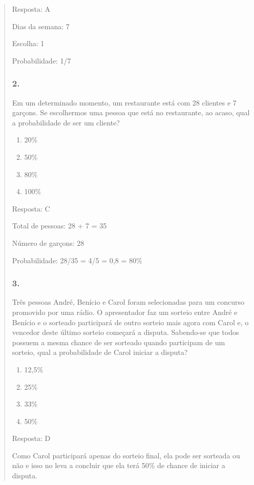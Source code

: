 \begin{enumerate}
\begin{escolha}
\begin{enumerate}
\begin{itemize}
\begin{itemize}
\begin{escolha}
\begin{quote}
\begin{escolha}
Resposta: A

Dias da semana: 7

Escolha: 1

Probabilidade: 1/7

\subsubsection{2.}\label{section-89}

Em um determinado momento, um restaurante está com 28 clientes e 7
garçons. Se escolhermos uma pessoa que está no restaurante, ao acaso,
qual a probabilidade de ser um cliente?

\begin{enumerate}
\def\labelenumi{\alph{enumi})}
\item
  20\%
\item
  50\%
\item
  80\%
\item
  100\%
\end{enumerate}

Resposta: C

Total de pessoas: 28 + 7 = 35

Número de garçons: 28

Probabilidade: 28/35 = 4/5 = 0,8 = 80\%

\subsubsection{3.}\label{section-90}

Três pessoas André, Benício e Carol foram selecionadas para um concurso
promovido por uma rádio. O apresentador faz um sorteio entre André e
Benício e o sorteado participará de outro sorteio mais agora com Carol
e, o vencedor deste último sorteio começará a disputa. Sabendo-se que
todos possuem a mesma chance de ser sorteado quando participam de um
sorteio, qual a probabilidade de Carol iniciar a disputa?

\begin{enumerate}
\def\labelenumi{\alph{enumi})}
\item
  12,5\%
\item
  25\%
\item
  33\%
\item
  50\%
\end{enumerate}

Resposta: D

Como Carol participará apenas do sorteio final, ela pode ser sorteada ou
não e isso no leva a concluir que ela terá 50\% de chance de iniciar a
disputa.


\end{escolha}
\end{quote}
\end{escolha}
\end{itemize}
\end{itemize}
\end{enumerate}
\end{escolha}
\end{enumerate}
